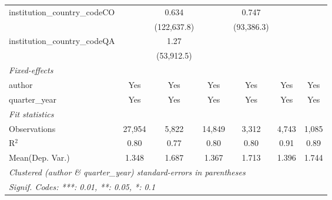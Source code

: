 \begin{tabular}{lcccccc}
   institution\_country\_codeCO          &               & 0.634         &               & 0.747         &              &   \\   
                                         &               & (122,637.8)   &               & (93,386.3)    &              &   \\   
   institution\_country\_codeQA          &               & 1.27          &               &               &              &   \\   
                                         &               & (53,912.5)    &               &               &              &   \\   
   \midrule
   \emph{Fixed-effects}\\
   author                                & Yes           & Yes           & Yes           & Yes           & Yes          & Yes\\  
   quarter\_year                         & Yes           & Yes           & Yes           & Yes           & Yes          & Yes\\  
   \midrule
   \emph{Fit statistics}\\
   Observations                          & 27,954        & 5,822         & 14,849        & 3,312         & 4,743        & 1,085\\  
   R$^2$                                 & 0.80          & 0.77          & 0.80          & 0.80          & 0.91         & 0.89\\  
Mean(Dep. Var.) & 1.348 & 1.687 & 1.367 & 1.713 & 1.396 & 1.744 \\
   \midrule \midrule
   \multicolumn{7}{l}{\emph{Clustered (author \& quarter\_year) standard-errors in parentheses}}\\
   \multicolumn{7}{l}{\emph{Signif. Codes: ***: 0.01, **: 0.05, *: 0.1}}\\
\end{tabular}
\par\endgroup
